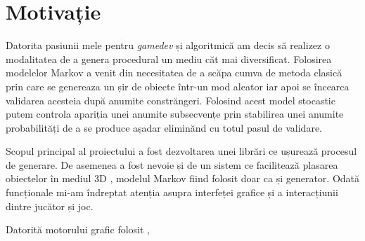 \chapter*{Motivație} 

Datorita pasiunii mele pentru \textit{gamedev} și algoritmică am decis să realizez o modalitatea de a genera procedural un mediu căt mai diversificat. Folosirea modelelor Markov a venit din necesitatea de a scăpa cumva de metoda clasică prin care se genereaza un șir de obiecte într-un mod aleator iar apoi se încearca validarea acesteia după anumite constrăngeri. Folosind acest model stocastic putem controla apariția unei anumite subsecvențe prin stabilirea unei anumite probabilități de a se produce așadar eliminănd cu totul pasul de validare.\par

Scopul principal al proiectului a fost dezvoltarea unei librări ce ușurează procesul de generare. De asemenea a fost nevoie și de un sistem ce facilitează plasarea obiectelor în mediul 3D , modelul Markov fiind folosit doar ca și generator. Odată funcționale mi-am îndreptat atenția asupra interfeței grafice și a interacțiunii dintre jucător și joc.\par

Datorită motorului grafic folosit , 







